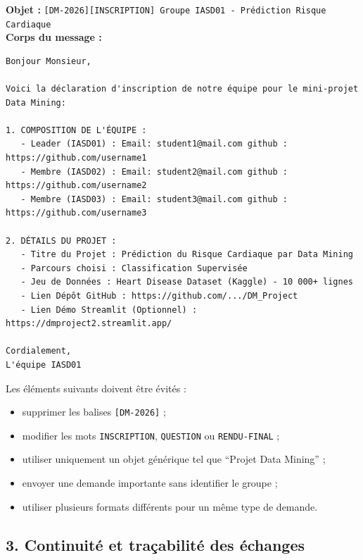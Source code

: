 \documentclass[11pt,a4paper]{article}
\begin{document}
\begin{tcolorbox}[
    colback=sintefblue!8,
    colframe=sintefblue,
    title=\textbf{DIRECTIVES OFFICIELLES DE COMMUNICATION, DE SUIVI ET DE RENDU},
    arc=2mm,
    boxrule=0.8pt,
    breakable
]
\vspace{3mm}

\begin{tcolorbox}[colback=gray!5, colframe=sintefblue, title=\textbf{MODÈLE D'EMAIL D'INSCRIPTION À COPIER / COMPLÉTER}, arc=2mm]
\small
\textbf{Objet :} \texttt{[DM-2026][INSCRIPTION] Groupe IASD01 - Prédiction Risque Cardiaque}\\[0.2cm]
\textbf{Corps du message :}
\begin{verbatim}
Bonjour Monsieur,

Voici la déclaration d'inscription de notre équipe pour le mini-projet Data Mining:

1. COMPOSITION DE L'ÉQUIPE :
   - Leader (IASD01) : Email: student1@mail.com github : https://github.com/username1
   - Membre (IASD02) : Email: student2@mail.com github : https://github.com/username2
   - Membre (IASD03) : Email: student3@mail.com github : https://github.com/username3

2. DÉTAILS DU PROJET :
   - Titre du Projet : Prédiction du Risque Cardiaque par Data Mining
   - Parcours choisi : Classification Supervisée
   - Jeu de Données : Heart Disease Dataset (Kaggle) - 10 000+ lignes
   - Lien Dépôt GitHub : https://github.com/.../DM_Project
   - Lien Démo Streamlit (Optionnel) : https://dmproject2.streamlit.app/

Cordialement,
L'équipe IASD01
\end{verbatim}
\end{tcolorbox}

\vspace{2mm}

Les éléments suivants doivent être évités :

\begin{itemize}
    \item supprimer les balises \texttt{[DM-2026]} ;
    \item modifier les mots \texttt{INSCRIPTION}, \texttt{QUESTION} ou
          \texttt{RENDU-FINAL} ;
    \item utiliser uniquement un objet générique tel que
          ``Projet Data Mining'' ;
    \item envoyer une demande importante sans identifier le groupe ;
    \item utiliser plusieurs formats différents pour un même type de demande.
\end{itemize}

\subsection*{3. Continuité et traçabilité des échanges}


\end{tcolorbox}
\end{document}
